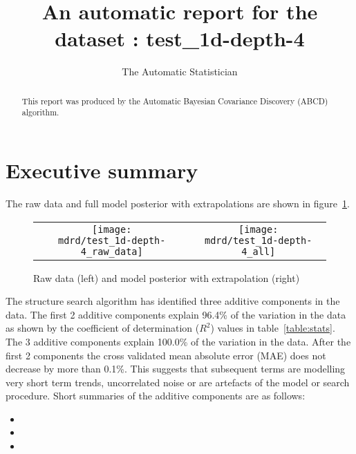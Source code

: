\documentclass{article} %
\title{An automatic report for the dataset : test_1d-depth-4}
\author{
The Automatic Statistician
}
\begin{document}
\allowdisplaybreaks

\maketitle

\begin{abstract}
This report was produced by the Automatic Bayesian Covariance Discovery (ABCD) algorithm.
\end{abstract}

\section{Executive summary}

The raw data and full model posterior with extrapolations are shown in figure~\ref{fig:rawandfit}.

\begin{figure}[H]
\newcommand{\wmgd}{0.5\columnwidth}
\newcommand{\hmgd}{3.0cm}
\newcommand{\mdrd}{test_1d-depth-4}
\newcommand{\mbm}{\hspace{-0.3cm}}
\begin{tabular}{cc}
\mbm \texttt{[image: \\mdrd/test\_1d-depth-4\_raw\_data]} & \texttt{[image: \\mdrd/test\_1d-depth-4\_all]}
\end{tabular}
\caption{Raw data (left) and model posterior with extrapolation (right)}
\label{fig:rawandfit}
\end{figure}

The structure search algorithm has identified three additive components in the data.
The  first 2 additive components explain 96.4\% of the variation in the data as shown by the coefficient of determination ($R^2$) values in table~\ref{table:stats}.
The 3 additive components explain 100.0\% of the variation in the data.
After the first 2 components the cross validated mean absolute error (MAE) does not decrease by more than 0.1\%.
This suggests that subsequent terms are modelling very short term trends, uncorrelated noise or are artefacts of the model or search procedure.
Short summaries of the additive components are as follows:
\begin{itemize}

  \item  

  \item  

  \item  

\end{itemize}
\end{document}
